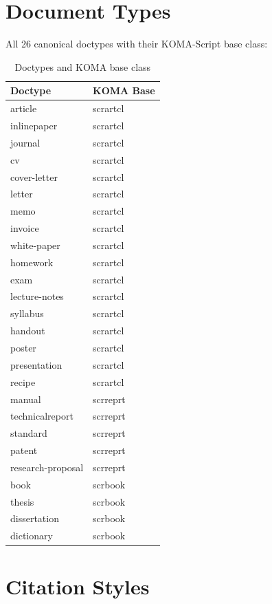 \section{Document Types}

All 26 canonical doctypes with their KOMA-Script base class:

\begin{table}[htbp]
  \centering
  \caption{Doctypes and KOMA base class}
  \label{tab:doctype-ref}
  \begin{tabular}{@{} l l @{}}
    \toprule
    \textbf{Doctype} & \textbf{KOMA Base} \\
    \midrule
    article & scrartcl \\
    inlinepaper & scrartcl \\
    journal & scrartcl \\
    cv & scrartcl \\
    cover-letter & scrartcl \\
    letter & scrartcl \\
    memo & scrartcl \\
    invoice & scrartcl \\
    white-paper & scrartcl \\
    homework & scrartcl \\
    exam & scrartcl \\
    lecture-notes & scrartcl \\
    syllabus & scrartcl \\
    handout & scrartcl \\
    poster & scrartcl \\
    presentation & scrartcl \\
    recipe & scrartcl \\
    manual & scrreprt \\
    technicalreport & scrreprt \\
    standard & scrreprt \\
    patent & scrreprt \\
    research-proposal & scrreprt \\
    book & scrbook \\
    thesis & scrbook \\
    dissertation & scrbook \\
    dictionary & scrbook \\
    \bottomrule
  \end{tabular}
\end{table}

\section{Citation Styles}

